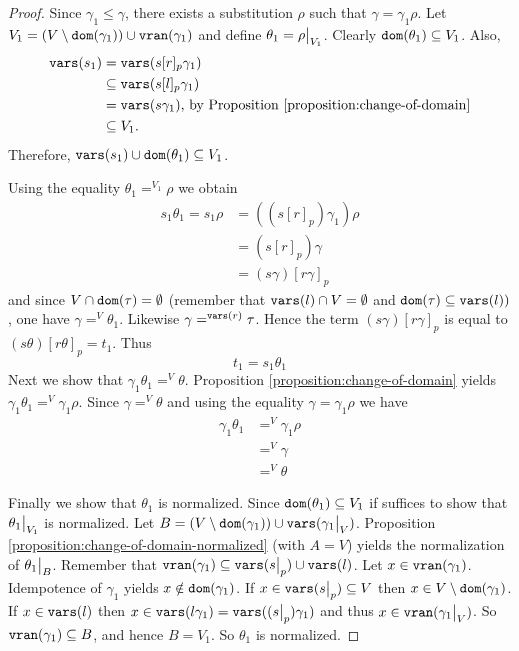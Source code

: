 \begin{lemma}
\begin{proof}
		Since $\gamma_1 \leq \gamma$, there exists a substitution $\rho$ such that $\gamma = \gamma_1 \rho$. Let $V_1 = (V \setminus \mathtt{dom}(\gamma_1)) \cup \mathtt{v}\mathtt{ran}(\gamma_1)$ and define $\theta_1 = \restr{\rho}{V_1}$. Clearly $\mathtt{dom}(\theta_1) \subseteq V_1$. Also,
		\begin{align*}
			\mathtt{vars}(s_1) & = \mathtt{vars}(s[r]_p \gamma_1)                                                       \\
			           & \subseteq \mathtt{vars}(s[l]_p \gamma_1)                                               \\
			           & = \mathtt{vars}(s \gamma_1) \text{, by Proposition \ref{proposition:change-of-domain}} \\
			           & \subseteq V_1.
		\end{align*}
		Therefore, $\mathtt{vars}(s_1) \cup \mathtt{dom}(\theta_1) \subseteq V_1$.

		Using the equality $\theta_1 =^{V_1} \rho$ we obtain
		\begin{align*}
			s_1 \theta_1 = s_1\rho & = ( (s[r]_p)\gamma_1)\rho \\
			                       & = (s[r]_p)\gamma          \\
			                       & = (s\gamma)[r\gamma]_p
		\end{align*}
		and since $V \cap \mathtt{dom}(\tau) = \emptyset$ (remember that $\mathtt{vars}(l) \cap V = \emptyset$ and $\mathtt{dom}(\tau) \subseteq \mathtt{vars}(l))$, one have $\gamma =^{V} \theta_1$. Likewise $\gamma =^{\mathtt{vars}(r)} \tau$. Hence the term $(s\gamma)[r\gamma]_p$ is equal to $(s\theta)[r\theta]_p = t_1$. Thus
		\begin{equation}\label{lifting-lemma:eqn:t_1-instance-s_1}
			t_1 = s_1\theta_1
		\end{equation}
		Next we show that $\gamma_1\theta_1 =^V \theta$. Proposition \ref{proposition:change-of-domain} yields $\gamma_1\theta_1 =^V \gamma_1\rho$. Since $\gamma =^V \theta$ and using the equality $\gamma = \gamma_1\rho$ we have
		\begin{align}
			\gamma_1 \theta_1 & =^V \gamma_1 \rho \nonumber                            \\
			                  & =^V \gamma \nonumber                                   \\
			                  & =^V \label{lifting-lemma:gamma1-instance-theta} \theta
		\end{align}

		Finally we show that $\theta_1$ is normalized. Since $\mathtt{dom}(\theta_1) \subseteq V_1$ if suffices to show that $\restr{\theta_1}{V_1}$ is normalized. Let $B = (V \setminus \dom{\gamma_1}) \cup \vars{\restr{\gamma_1}{V}}$. Proposition \ref{proposition:change-of-domain-normalized} (with $A = V$) yields the normalization of $\restr{\theta_1}{B}$. Remember that $\vran{\gamma_1} \subseteq \vars{\restr{s}{p}} \cup \vars{l}$. Let $x \in \mathtt{v}\mathtt{ran}(\gamma_1)$. Idempotence of $\gamma_1$ yields $x \notin \mathtt{dom}(\gamma_1)$. If $x \in \vars{\restr{s}{p}} \subseteq V$ then $x \in V \setminus \mathtt{dom}(\gamma_1)$. If $x \in \mathtt{vars}(l)$ then $x \in \vars{l\gamma_1} = \vars{(\restr{s}{p})\gamma_1}$ and thus $x \in \vran{\restr{\gamma_1}{V}}$. So $\mathtt{v}\mathtt{ran}(\gamma_1) \subseteq B$, and hence $B = V_1$. So $\theta_1$ is normalized.


\end{proof}
\end{lemma}
